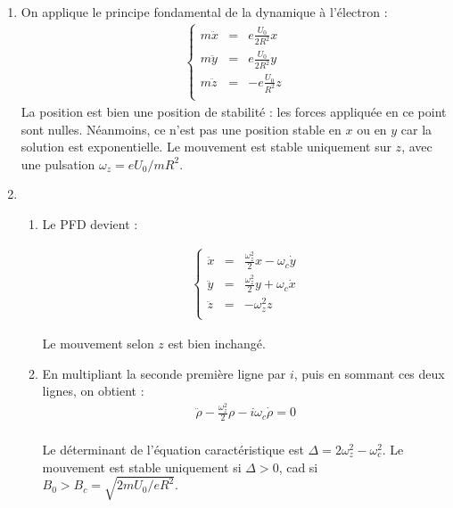 \begin{correction}

\begin{enumerate}

	\item On applique le principe fondamental de la dynamique à l'électron :
\begin{align*}
	\left\lbrace
\begin{array}{ccc}
 m\ddot{x} &=&  e\frac{U_0}{2R^2}x \\
 m\ddot{y} &=& e\frac{U_0}{2R^2}y \\
 m\ddot{z} &= & -e\frac{U_0}{R^2}z \\
\end{array}\right.
\end{align*}
La position est bien une position de stabilité : les forces appliquée en ce point sont nulles. Néanmoins, ce n'est pas une position stable en $x$ ou en $y$ car la solution est exponentielle. Le mouvement est stable uniquement sur $z$, avec une pulsation $\omega_z=eU_0/mR^2$.

\item

\begin{enumerate}

		\item Le PFD devient :
		
\begin{align*}
	\left\lbrace
\begin{array}{ccc}
 \ddot{x} &=&  \frac{\omega_z^2}{2}x - \omega_c\dot{y}\\
 \ddot{y} &=& \frac{\omega_z^2}{2}y + \omega_c\dot{x} \\
 \ddot{z} &= & -\omega_z^2z \\
\end{array}\right.
\end{align*}

Le mouvement selon $z$ est bien inchangé. 

		\item En multipliant la seconde première ligne par $i$, puis en sommant ces deux lignes, on obtient :
		\begin{align*}
 \ddot{\rho} - \frac{\omega_z^2}{2}\rho - i\omega_c\dot{\rho}=0\\
\end{align*}
		
		Le déterminant de l'équation caractéristique est $\Delta=2\omega_z^2-\omega_c^2$. Le mouvement est stable uniquement si $\Delta>0$, cad si $B_0>B_c=\sqrt{2mU_0/eR^2}$.
		

\end{enumerate}
\end{enumerate}
\end{correction}
